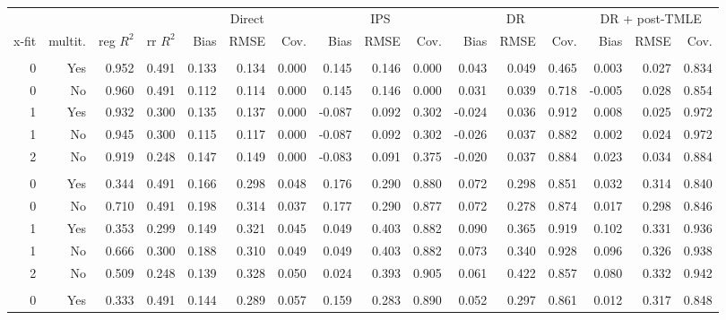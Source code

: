 \begin{tabular}{*{16}{r}} 
\toprule 
&&&& \multicolumn{3}{c}{Direct} & \multicolumn{3}{c}{IPS} & \multicolumn{3}{c}{DR} & \multicolumn{3}{c}{DR + post-TMLE} \\ 
\cmidrule(lr){5-7} \cmidrule(lr){8-10} \cmidrule(lr){11-13} \cmidrule(lr){14-16} 
x-fit & multit. & reg $R^2$ &  rr $R^2$ &  Bias &  RMSE &  Cov. &  Bias &  RMSE &  Cov. &  Bias &  RMSE &  Cov. &  Bias &  RMSE &  Cov. \\ 
\midrule 
\addlinespace 
 \multicolumn{16}{l}{\textbf{1. Simple $f$}} \\ 
0 & Yes & 0.952 & 0.491 & 0.133 & 0.134 & 0.000 & 0.145 & 0.146 & 0.000 & 0.043 & 0.049 & 0.465 & 0.003 & 0.027 & 0.834 \\ 
0 & No & 0.960 & 0.491 & 0.112 & 0.114 & 0.000 & 0.145 & 0.146 & 0.000 & 0.031 & 0.039 & 0.718 & -0.005 & 0.028 & 0.854 \\ 
1 & Yes & 0.932 & 0.300 & 0.135 & 0.137 & 0.000 & -0.087 & 0.092 & 0.302 & -0.024 & 0.036 & 0.912 & 0.008 & 0.025 & 0.972 \\ 
1 & No & 0.945 & 0.300 & 0.115 & 0.117 & 0.000 & -0.087 & 0.092 & 0.302 & -0.026 & 0.037 & 0.882 & 0.002 & 0.024 & 0.972 \\ 
2 & No & 0.919 & 0.248 & 0.147 & 0.149 & 0.000 & -0.083 & 0.091 & 0.375 & -0.020 & 0.037 & 0.884 & 0.023 & 0.034 & 0.884 \\ 
\addlinespace 
 \multicolumn{16}{l}{\textbf{2. Simple $f$ with linear confound.}} \\ 
0 & Yes & 0.344 & 0.491 & 0.166 & 0.298 & 0.048 & 0.176 & 0.290 & 0.880 & 0.072 & 0.298 & 0.851 & 0.032 & 0.314 & 0.840 \\ 
0 & No & 0.710 & 0.491 & 0.198 & 0.314 & 0.037 & 0.177 & 0.290 & 0.877 & 0.072 & 0.278 & 0.874 & 0.017 & 0.298 & 0.846 \\ 
1 & Yes & 0.353 & 0.299 & 0.149 & 0.321 & 0.045 & 0.049 & 0.403 & 0.882 & 0.090 & 0.365 & 0.919 & 0.102 & 0.331 & 0.936 \\ 
1 & No & 0.666 & 0.300 & 0.188 & 0.310 & 0.049 & 0.049 & 0.403 & 0.882 & 0.073 & 0.340 & 0.928 & 0.096 & 0.326 & 0.938 \\ 
2 & No & 0.509 & 0.248 & 0.139 & 0.328 & 0.050 & 0.024 & 0.393 & 0.905 & 0.061 & 0.422 & 0.857 & 0.080 & 0.332 & 0.942 \\ 
\addlinespace 
 \multicolumn{16}{l}{\textbf{3. Simple $f$ with linear and non-linear confound.}} \\ 
0 & Yes & 0.333 & 0.491 & 0.144 & 0.289 & 0.057 & 0.159 & 0.283 & 0.890 & 0.052 & 0.297 & 0.861 & 0.012 & 0.317 & 0.848 \\ 

\end{tabular}
